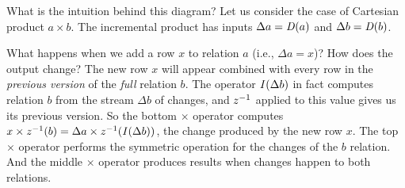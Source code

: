 What is the intuition behind this diagram?  Let us consider the case
of Cartesian product $a \times b$.  The incremental product has inputs
$\Delta a = \mathit{D}(a)$ and $\Delta b = \mathit{D}(b)$.

What happens when we add a row $x$ to relation $a$ (i.e., $\Delta a =
x$)?  How does the output change?  The new row $x$ will appear
combined with every row in the \emph{previous version} of the
\emph{full} relation $b$.  The operator $\mathit{I}(\Delta b)$ in fact
computes relation $b$ from the stream $\Delta b$ of changes, and $z^{-1}$
applied to this value gives us its previous version.  So the bottom
$\times$ operator computes $x \times z^{-1}(b) = \Delta a \times
z^{-1}(\mathit{I}(\Delta b))$, the change produced by the new row $x$.  The top
$\times$ operator performs the symmetric operation for the changes of
the $b$ relation.  And the middle $\times$ operator produces results
when changes happen to both relations.

%
